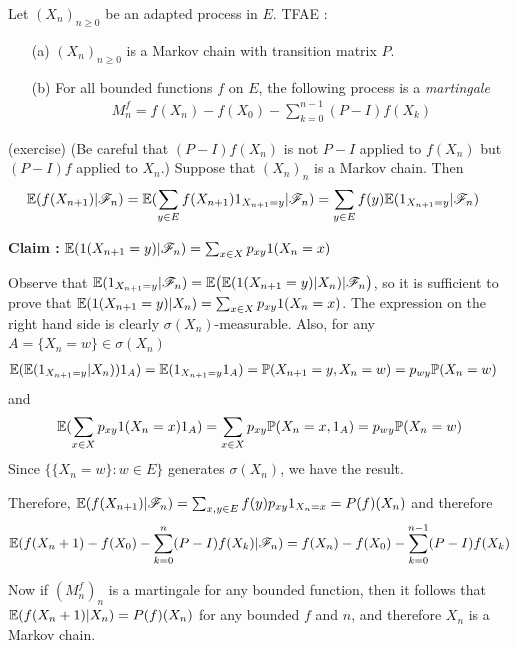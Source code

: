 \documentclass[12pt,a4paper]{report}
\newenvironment{proof}
{\begin{changemargin}{1cm}{0.5cm} 
	}%
	{\end{changemargin}
}
\newenvironment{subproof}
{\begin{changemargin}{0.5cm}{0.5cm} 
	}%
	{\end{changemargin}
}
\begin{document}
 Let $(X_n)_{n\geq 0}$ be an adapted process in $E$. TFAE :
\begin{itemize}
\item[(a)] $(X_n)_{n\geq 0}$ is a Markov chain with transition matrix $P$.
\item[(b)] For all bounded functions $f$ on $E$, the following process is a \emph{martingale}
\begin{align*}
M^f_n = f(X_n) - f(X_0) - \sum_{k=0}^{n-1} (P-I) f(X_k)
\end{align*}
\end{itemize}
\begin{proof}
\pf (exercise) (Be careful that $(P-I)f(X_n)$ is not $P-I$ applied to $f(X_n)$ but $(P-I)f$ applied to $X_n$.) Suppose that $(X_n)_n$ is a Markov chain. Then
\begin{align*}
& \mathbb{E}(f(X_{n+1}) |\mathscr{F}_n) = \mathbb{E}( \sum_{y\in E} f(X_{n+1}) 1_{X_{n+1}=y} | \mathscr{F}_n) = \sum_{y\in E} f(y) \mathbb{E}( 1_{X_{n+1}=y} |\mathscr{F}_n)
\end{align*}
\begin{subproof}
\textbf{Claim :} $\mathbb{E}(1(X_{n+1}=y) |\mathscr{F}_n) = \sum_{x\in X} p_{xy} 1(X_n = x)$

\pf Observe that $\mathbb{E}(1_{X_{n+1}=y} |\mathscr{F}_n)= \mathbb{E}\big(\mathbb{E}(1(X_{n+1}=y) |X_n) |\mathscr{F}_n \big)$, so it is sufficient to prove that $\mathbb{E}(1(X_{n+1}=y) |X_n) = \sum_{x\in X} p_{xy} 1(X_n = x)$. The expression on the right hand side is clearly $\sigma(X_n)$-measurable. Also, for any $A = \{X_n = w\} \in \sigma(X_n)$
\begin{align*}
&\mathbb{E}( \mathbb{E}(1_{X_{n+1}=y} |X_n)) 1_A ) = \mathbb{E}( 1_{X_{n+1}=y} 1_A ) = \mathbb{P}(X_{n+1}=y, X_n = w) = p_{wy} \mathbb{P}(X_n =w)
\end{align*}
and
\begin{align*}
\mathbb{E}(\sum_{x\in X} p_{xy} 1(X_n = x) 1_A) = \sum_{x\in X}p_{xy} \mathbb{P}(X_n =x, 1_A) = p_{wy} \mathbb{P}(X_n = w)
\end{align*}
Since $\{ \{X_n = w\} : w\in E\}$ generates $\sigma(X_n)$, we have the result.
\end{subproof}
Therefore, 
$\mathbb{E}(f(X_{n+1}) |\mathscr{F}_n) = \sum_{x,y\in E} f(y) p_{xy} 1_{X_n = x} = P(f)(X_n)$ and therefore
\begin{align*}
\mathbb{E}(f(X_n+1) - f(X_0) - \sum_{k=0}^{n} (P-I) f(X_k) |\mathscr{F}_n) = f(X_n) - f(X_0) - \sum_{k=0}^{n-1} (P-I) f(X_k)
\end{align*}
\s

Now if $(M^f_n)_n$ is a martingale for any bounded function, then it follows that $\mathbb{E}(f(X_n+1)|X_n) = P(f)(X_n)$ for any bounded $f$ and $n$, and therefore $X_n$ is a Markov chain.
\end{proof}
\s
\end{document}
